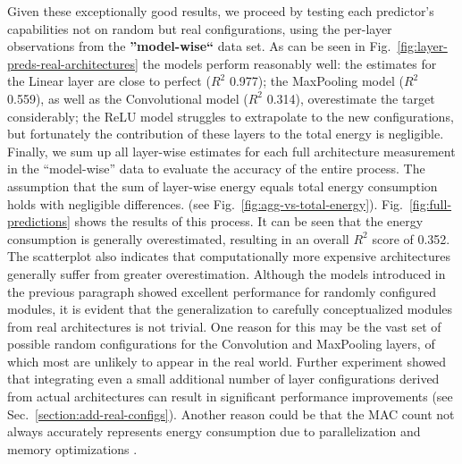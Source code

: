 Given these exceptionally good results, we proceed by testing each predictor's capabilities not on random but real configurations, using the per-layer observations from the \textbf{''model-wise``} data set. As can be seen in Fig.~\ref{fig:layer-preds-real-architectures} the models perform reasonably well: the estimates for the Linear layer are close to perfect ($R^2$ 0.977); the MaxPooling model ($R^2$ 0.559), as well as the Convolutional model ($R^2$ 0.314), overestimate the target considerably; the ReLU model struggles to extrapolate to the new configurations, but fortunately the contribution of these layers to the total energy is negligible. Finally, we sum up all layer-wise estimates for each full architecture measurement in the ``model-wise'' data to evaluate the accuracy of the entire process. The assumption that the sum of layer-wise energy equals total energy consumption holds with negligible differences. (see Fig.~\ref{fig:agg-vs-total-energy}). Fig.~\ref{fig:full-predictions} shows the results of this process. It can be seen that the energy consumption is generally overestimated, resulting in an overall $R^2$ score of 0.352. The scatterplot also indicates that computationally more expensive architectures generally suffer from greater overestimation. Although the models introduced in the previous paragraph showed excellent performance for randomly configured modules, it is evident that the generalization to carefully conceptualized modules from real architectures is not trivial. One reason for this may be the vast set of possible random configurations for the Convolution and MaxPooling layers, of which most are unlikely to appear in the real world. Further experiment showed that integrating even a small additional number of layer configurations derived from actual architectures can result in significant performance improvements (see Sec.~\ref{section:add-real-configs}). Another reason could be that the MAC count not always accurately represents energy consumption due to parallelization and memory optimizations \citep{Dissecting_DBLP:journals/corr/abs-2107-11949, misnomer}.

